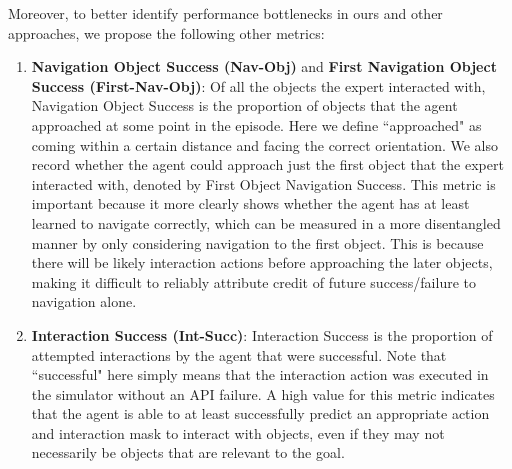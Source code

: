 \documentclass[11pt,a4paper]{article}
\begin{document}

Moreover, to better identify performance bottlenecks in ours and other approaches, we propose the following other metrics:

\begin{enumerate}
    \item \textbf{Navigation Object Success (Nav-Obj)} and \textbf{First Navigation Object Success (First-Nav-Obj)}: Of all the objects the expert interacted with, Navigation Object Success is the proportion of objects that the agent approached at some point in the episode. Here we define ``approached" as coming within a certain distance and facing the correct orientation. We also record whether the agent could approach just the first object that the expert interacted with, denoted by First Object Navigation Success. This metric is important because it more clearly shows whether the agent has at least learned to navigate correctly, which can be measured in a more disentangled manner by only considering navigation to the first object. This is because there will be likely interaction actions before approaching the later objects, making it difficult to reliably attribute credit of future success/failure to navigation alone.

    
    \item \textbf{Interaction Success (Int-Succ)}: Interaction Success is the proportion of attempted interactions by the agent that were successful. Note that ``successful" here simply means that the interaction action was executed in the simulator without an API failure. A high value for this metric indicates that the agent is able to at least successfully predict an appropriate action and interaction mask to interact with objects, even if they may not necessarily be objects that are relevant to the goal.
    

\end{enumerate}
\end{document}
